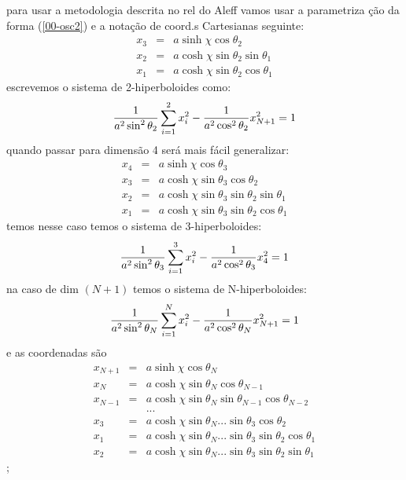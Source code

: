 \documentclass[a4paper,12pt]{article}
\begin{document}
para usar a metodologia descrita no rel do Aleff vamos usar a parametriza%
\c{c}\~{a}o da forma (\ref{00-osc2}) e a nota\c{c}\~{a}o de coord.s
Cartesianas seguinte:%
\begin{eqnarray*}
x_{3} &=&a\sinh \chi \cos \theta _{2} \\
x_{2} &=&a\cosh \chi \sin \theta _{2}\sin \theta _{1} \\
x_{1} &=&a\cosh \chi \sin \theta _{2}\cos \theta _{1}
\end{eqnarray*}%
escrevemos o sistema de 2-hiperboloides como:%
\begin{equation*}
\frac{1}{a^{2}\sin ^{2}\theta _{2}}\sum_{i=1}^{2}x_{i}^{2}-\frac{1}{%
a^{2}\cos ^{2}\theta _{2}}x_{N+1}^{2}=1
\end{equation*}%
quando passar para dimens\~{a}o 4 ser\'{a} mais f\'{a}cil generalizar:%
\begin{eqnarray*}
x_{4} &=&a\sinh \chi \cos \theta _{3} \\
x_{3} &=&a\cosh \chi \sin \theta _{3}\cos \theta _{2} \\
x_{2} &=&a\cosh \chi \sin \theta _{3}\sin \theta _{2}\sin \theta _{1} \\
x_{1} &=&a\cosh \chi \sin \theta _{3}\sin \theta _{2}\cos \theta _{1}
\end{eqnarray*}%
temos nesse caso temos o sistema de 3-hiperboloides:%
\begin{equation*}
\frac{1}{a^{2}\sin ^{2}\theta _{3}}\sum_{i=1}^{3}x_{i}^{2}-\frac{1}{%
a^{2}\cos ^{2}\theta _{3}}x_{4}^{2}=1
\end{equation*}%
na caso de dim $\left( N+1\right) $ temos o sistema de N-hiperboloides:%
\begin{equation*}
\frac{1}{a^{2}\sin ^{2}\theta _{N}}\sum_{i=1}^{N}x_{i}^{2}-\frac{1}{%
a^{2}\cos ^{2}\theta _{N}}x_{N+1}^{2}=1
\end{equation*}%
e as coordenadas s\~{a}o%
\begin{eqnarray*}
x_{N+1} &=&a\sinh \chi \cos \theta _{N} \\
x_{N} &=&a\cosh \chi \sin \theta _{N}\cos \theta _{N-1} \\
x_{N-1} &=&a\cosh \chi \sin \theta _{N}\sin \theta _{N-1}\cos \theta _{N-2}
\\
&&... \\
x_{3} &=&a\cosh \chi \sin \theta _{N}...\sin \theta _{3}\cos \theta _{2} \\
x_{1} &=&a\cosh \chi \sin \theta _{N}...\sin \theta _{3}\sin \theta _{2}\cos
\theta _{1} \\
x_{2} &=&a\cosh \chi \sin \theta _{N}...\sin \theta _{3}\sin \theta _{2}\sin
\theta _{1}
\end{eqnarray*}%
;
\end{document}
